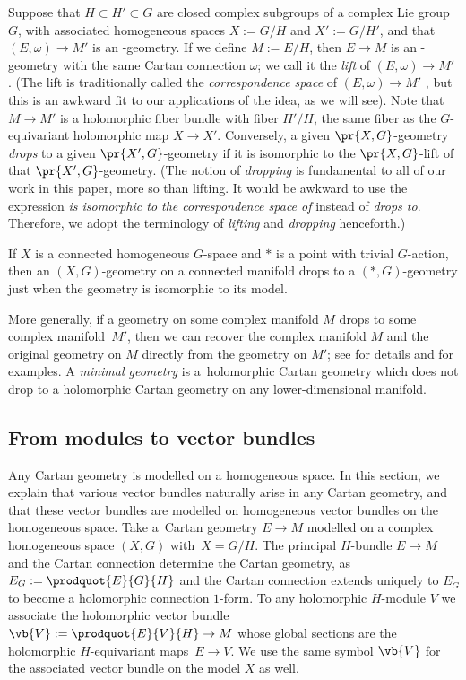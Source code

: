 Suppose that $H \subset H' \subset G$ are closed complex subgroups of a complex Lie group $G$, with associated homogeneous
spaces $X := G/H$ and $X' := G/H'$, and that $(E, \omega) \to M'$ is an -geometry.
If we define $M := E/H$, then $E \to M$ is an -geometry with the same Cartan connection $\omega$;
we call it the \emph{lift} of $(E, \omega) \to M'$ \cite[Section~1.5.13]{Cap/Slovak:2009}.
(The lift is traditionally called the \emph{correspondence space} of $(E, \omega) \to M'$ \cite[Section~1.5.13]{Cap/Slovak:2009}, but this is an awkward fit to our applications of the idea, as we will see).
Note that $M \to M'$ is a holomorphic fiber bundle
with fiber $H'/H$, the same fiber as the $G$-equivariant holomorphic map $X \to X'$.
Conversely, a given $\pr{X, G}$-geometry \emph{drops} to a given $\pr{X',G}$-geometry if it is isomorphic to the $\pr{X, G}$-lift
of that $\pr{X', G}$-geometry.
(The notion of \emph{dropping} is fundamental to all of our work in this paper, more so than lifting. It would be awkward to use the expression \emph{is isomorphic to the correspondence space of} instead of \emph{drops to}.
Therefore, we adopt the terminology of \emph{lifting} and \emph{dropping} henceforth.)

\begin{Example}
If $X$ is a connected homogeneous $G$-space and $*$ is a point with trivial $G$-action, then an $(X, G)$-geometry on a
connected manifold drops to a $(*, G)$-geometry just when the geometry is isomorphic to its model.
\end{Example}

More generally, if a geometry on some complex manifold $M$ drops to some complex manifold~$M'$, then we can recover the complex manifold $M$ and the original geometry on $M$ directly from the geometry on $M'$; see \cite{Biswas.McKay:2016} for details and \cite{McKay2011b} for examples.
A \emph{minimal geometry} is a~holomorphic Cartan geometry which does not drop to a holomorphic Cartan geometry on any lower-dimensional manifold.

\subsection{From modules to vector bundles}
Any Cartan geometry is modelled on a homogeneous space.
In this section, we explain that various vector bundles naturally arise in any Cartan geometry, and that these vector bundles are modelled on homogeneous vector
bundles \cite[Section 10]{mckay2023introduction} on the homogeneous space.
Take a~Cartan geometry $E \to M$ modelled on a complex homogeneous space $(X, G)$ with~${X = G/H}$.
The principal $H$-bundle $E \to M$ and the Cartan connection determine the Cartan geometry,
as $E_G := \prodquot{E}{G}{H}$ and the Cartan connection extends uniquely to $E_G$ to become a holomorphic connection $1$-form.
To any holomorphic $H$-module $V$ we associate the holomorphic vector bundle~$\vb{V} := \prodquot{E}{V}{H} \to M$
whose global sections are the holomorphic $H$-equivariant maps~${E \to V}$.
We use the same symbol $\vb{V}$ for the associated vector bundle on the model $X$ as well.

